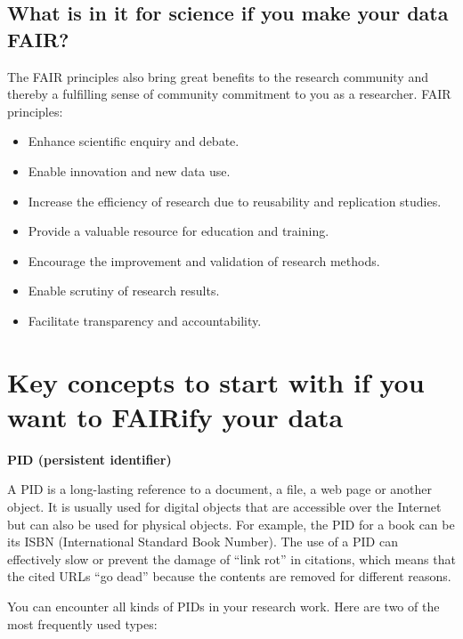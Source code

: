 \documentclass[
]{book}
\begin{document}
\hypertarget{what-is-in-it-for-science-if-you-make-your-data-fair}{%
\subsection*{What is in it for science if you make your data FAIR?}\label{what-is-in-it-for-science-if-you-make-your-data-fair}}

The FAIR principles also bring great benefits to the research community and thereby a fulfilling sense of community commitment to you as a researcher. FAIR principles:

\begin{itemize}
\item
  Enhance scientific enquiry and debate.
\item
  Enable innovation and new data use.
\item
  Increase the efficiency of research due to reusability and replication studies.
\item
  Provide a valuable resource for education and training.
\item
  Encourage the improvement and validation of research methods.
\item
  Enable scrutiny of research results.
\item
  Facilitate transparency and accountability.
\end{itemize}

\hypertarget{key-concepts-to-start-with-if-you-want-to-fairify-your-data}{%
\section{Key concepts to start with if you want to FAIRify your data}\label{key-concepts-to-start-with-if-you-want-to-fairify-your-data}}

\textbf{PID (persistent identifier)}

A PID is a long-lasting reference to a document, a file, a web page or another object. It is usually used for digital objects that are accessible over the Internet but can also be used for physical objects. For example, the PID for a book can be its ISBN (International Standard Book Number). The use of a PID can effectively slow or prevent the damage of ``link rot'' in citations, which means that the cited URLs ``go dead'' because the contents are removed for different reasons.

You can encounter all kinds of PIDs in your research work. Here are two of the most frequently used types:
\end{document}
